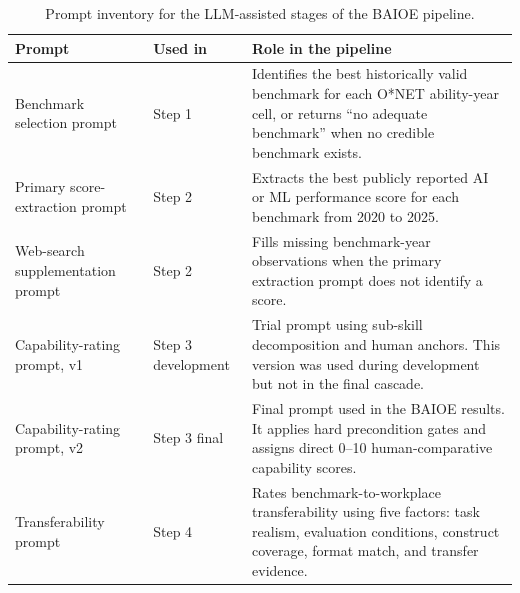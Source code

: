 \begin{table}[htbp]\centering
\caption{Prompt inventory for the LLM-assisted stages of the BAIOE pipeline.}\label{tab:prompts}
\begin{tabular}{llp{8cm}}\toprule
Prompt & Used in & Role in the pipeline \\ \midrule
Benchmark selection prompt & Step 1 & Identifies the best historically valid benchmark for each O*NET ability-year cell, or returns ``no adequate benchmark'' when no credible benchmark exists. \\
Primary score-extraction prompt & Step 2 & Extracts the best publicly reported AI or ML performance score for each benchmark from 2020 to 2025. \\
Web-search supplementation prompt & Step 2 & Fills missing benchmark-year observations when the primary extraction prompt does not identify a score. \\
Capability-rating prompt, v1 & Step 3 development & Trial prompt using sub-skill decomposition and human anchors. This version was used during development but not in the final cascade. \\
Capability-rating prompt, v2 & Step 3 final & Final prompt used in the BAIOE results. It applies hard precondition gates and assigns direct 0--10 human-comparative capability scores. \\
Transferability prompt & Step 4 & Rates benchmark-to-workplace transferability using five factors: task realism, evaluation conditions, construct coverage, format match, and transfer evidence. \\
\bottomrule\end{tabular}\end{table}
